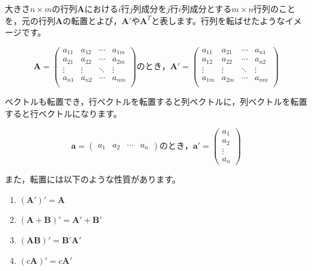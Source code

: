 \documentclass{ltjsbook}
\begin{document}
大きさ$n \times m$の行列$\bm{A}$における$i$行$j$列成分を$j$行$i$列成分とする$m \times n$行列のことを，元の行列$\bm{A}$の転置とよび，$\bm{A}'$や$\bm{A}^T$と表します。行列を転ばせたようなイメージです。

\begin{equation*}
	\bm{A}=
	\begin{pmatrix}
		a_{11} & a_{12} & \cdots & a_{1m} \\
		a_{21} & a_{22} & \cdots & a_{2m} \\
		\vdots & \vdots & \ddots & \vdots \\
		a_{n1} & a_{n2} & \cdots & a_{nm} \\
	\end{pmatrix}
	\mbox{のとき，}
	\bm{A}'=
	\begin{pmatrix}
		a_{11} & a_{21} & \cdots & a_{n1} \\
		a_{12} & a_{22} & \cdots & a_{n2} \\
		\vdots & \vdots & \ddots & \vdots \\
		a_{1m} & a_{2m} & \cdots & a_{nm} \\
	\end{pmatrix}
\end{equation*}


ベクトルも転置でき，行ベクトルを転置すると列ベクトルに，列ベクトルを転置すると行ベクトルになります。

\begin{equation*}
	\bm{a} =
	\begin{pmatrix}
		a_1 & a_2 & \cdots & a_n
	\end{pmatrix}
	\mbox{のとき，}
	\bm{a}'=
	\begin{pmatrix}
		a_1    \\
		a_2    \\
		\vdots \\
		a_n
	\end{pmatrix}
\end{equation*}

また，転置には以下のような性質があります。
\begin{enumerate}
	\item $(\bm{A} ')' = \bm{A}$
	\item $(\bm{A} + \bm{B} )' = \bm{A}' + \bm{B}'$
	\item $(\bm{A} \bm{B})'=\bm{B}'\bm{A}'$
	\item $(c\bm{A})'=c\bm{A}'$
\end{enumerate}
\end{document}
